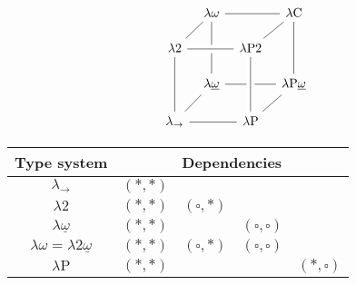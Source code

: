 \documentclass[reqno, twoside]{article}
\begin{document}
    \begin{center}
        \begin{minipage}{0.3\textwidth}
            \vspace{-0.15in}
            \begin{equation*}
                \begin{tikzcd}[row sep=scriptsize, column sep=0.1in]
                    & \lambda\omega \arrow[dl, -] \arrow[rr, -] \arrow[dd, -] & & \lambda\mathrm{C} \arrow[dl, -] \arrow[dd, -] \\
                    \lambda2 \arrow[rr, crossing over, -] \arrow[dd, -] & & \lambda\mathrm{P}2 \\
                    & \lambda\underline{\omega} \arrow[dl, -] \arrow[rr, -] & & \lambda\mathrm{P}\underline{\omega} \arrow[dl, -] \\
                    \lambda_\rightarrow \arrow[rr, -] & & \lambda\mathrm{P} \arrow[from=uu, crossing over, -]
                \end{tikzcd}
                \vspace{-0.05in}
            \end{equation*}
        \end{minipage}
        \begin{minipage}{0.5\textwidth}\small
            \begin{center}
                \begin{tabular}{c|cccc}
                    Type system & \multicolumn{4}{c}{Dependencies} \\
                    \hline
                    $\lambda_\rightarrow$                                    & $(\ast,\ast)$ &                  &                     &                  \\
                    $\lambda2$                                               & $(\ast,\ast)$ & $(\square,\ast)$ &                     &                  \\
                    $\lambda\underline{\omega}$                              & $(\ast,\ast)$ &                  & $(\square,\square)$ &                  \\
                    $\lambda\omega=\lambda2\underline{\omega}$               & $(\ast,\ast)$ & $(\square,\ast)$ & $(\square,\square)$ &                  \\
                    $\lambda\mathrm{P}$                                      & $(\ast,\ast)$ &                  &                     & $(\ast,\square)$ \\

\end{tabular}
\end{center}
\end{minipage}
\end{center}
\end{document}
